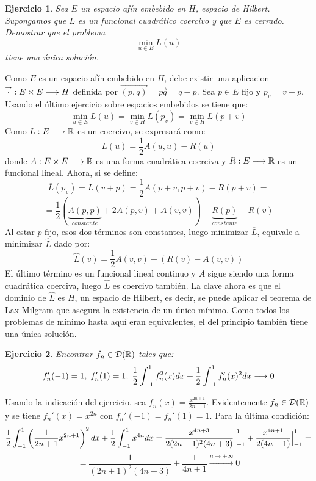 \documentclass[12pt]{article}
\newcommand{\flechita}[1]{\overset{\rightarrow}{ #1 }}
\newtheorem{ejercicio}{Ejercicio}
\theoremstyle{definition}
\theoremstyle{remark}
\begin{document}
\begin{ejercicio}
Sea $E$ un espacio afín embebido en $H$, espacio de Hilbert. Supongamos que $L$ es un funcional cuadrático coercivo y que $E$ es cerrado. Demostrar que el problema 
\[
\min_{u\in E}L(u)
\]
tiene una única solución.
\end{ejercicio}

Como $E$ es un espacio afín embebido en $H$, debe existir una aplicacion $\funcion{\flechita{\cdot}}{E\times E}{H}$ definida por $\flechita{(p,q)}=\flechita{pq}=q-p$. Sea $p\in E$ fijo y $p_v=v+p$. Usando el último ejercicio sobre espacios embebidos se tiene que:
\[
\min_{u\in E}L(u)=\min_{v\in H}L(p_v)=\min_{v\in H}L(p+v)
\]
Como $L : E \longrightarrow \mathbb{R}$ es un coercivo, se expresará como:
\[
L(u)=\frac{1}{2}A(u,u)-R(u)
\]
donde $A : E\times E \longrightarrow \mathbb{R}$ es una forma cuadrática coerciva y $R : E \longrightarrow \mathbb{R}$ es un funcional lineal. Ahora, si se define:
\[
\overline{L}(p_v)=L(v+p)=\frac{1}{2}A(p+v,p+v)-R(p+v)=
\]
\[
=\frac{1}{2}\left(\underbrace{A(p,p)}_{constante}+2A(p,v)+A(v,v)\right)-\underbrace{R(p)}_{constante}-R(v)
\]
Al estar $p$ fijo, esos dos términos son constantes, luego minimizar $\overline{L}$, equivale a minimizar $\widehat{L}$ dado por:
\[
\widehat{L}(v)=\frac{1}{2}A(v,v)-(R(v)-A(v,v))
\]
El último término es un funcional lineal continuo y $A$ sigue siendo una forma cuadrática coerciva, luego $\widehat{L}$ es coercivo también. La clave ahora es que el dominio de $\widehat{L}$ es $H$, un espacio de Hilbert, es decir, se puede aplicar el teorema de Lax-Milgram que asegura la existencia de un único mínimo. Como todos los problemas de mínimo hasta aquí eran equivalentes, el del principio también tiene una única solución. 


\begin{ejercicio}
Encontrar $f_n\in\mathcal{D}(\mathbb{R})$ tales que:
\[
f_n'(-1)=1, \; f_n'(1)=1, \; \frac{1}{2}\displaystyle\int_{ -1 }^{ 1 } f_n^2(x)dx+\frac{1}{2}\displaystyle\int_{ -1 }^{ 1 } f_n'(x)^2dx\longrightarrow 0
\]
\end{ejercicio}

Usando la indicación del ejercicio, sea $f_n(x)=\frac{x^{2n+1}}{2n+1}$. Evidentemente $f_n\in\mathcal{D}(\mathbb{R})$ y se tiene $f_n'(x)=x^{2n}$ con $f_n'(-1)=f_n'(1)=1$. Para la última condición:
\[
\frac{1}{2}\displaystyle\int_{ -1 }^{ 1 } \left(\frac{1}{2n+1}x^{2n+1}\right)^2dx+\frac{1}{2}\displaystyle\int_{ -1 }^{ 1 } x^{4n}dx=\frac{x^{4n+3}}{2(2n+1)^2(4n+3)}\Big|^1_{-1}+\frac{x^{4n+1}}{2(4n+1)}\Big|^1_{-1}=
\]
\[
= \frac{1}{(2n+1)^2(4n+3)}+\frac{1}{4n+1}\overset{n\to +\infty}{\longrightarrow}0
\]
\end{document}
